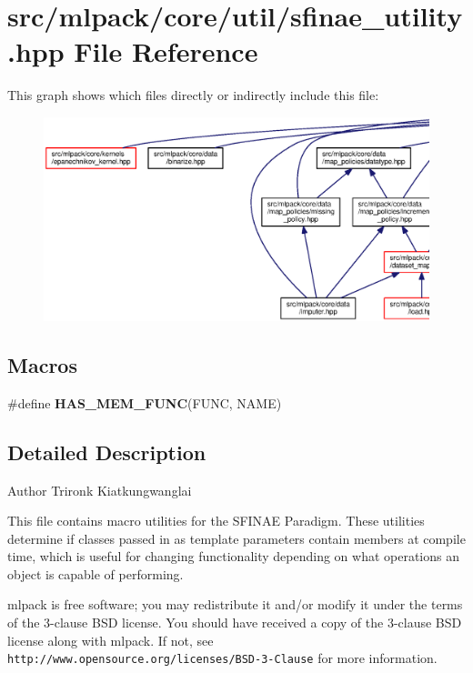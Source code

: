 \section{src/mlpack/core/util/sfinae\+\_\+utility.hpp File Reference}
\label{sfinae__utility_8hpp}
This graph shows which files directly or indirectly include this file\+:
\nopagebreak
\begin{figure}[H]
\begin{center}
\leavevmode
\includegraphics[width=350pt]{sfinae__utility_8hpp__dep__incl}
\end{center}
\end{figure}
\subsection*{Macros}
\begin{DoxyCompactItemize}
\item 
\#define {\bf H\+A\+S\+\_\+\+M\+E\+M\+\_\+\+F\+U\+NC}(F\+U\+NC,  N\+A\+ME)
\end{DoxyCompactItemize}


\subsection{Detailed Description}
\begin{DoxyAuthor}{Author}
Trironk Kiatkungwanglai
\end{DoxyAuthor}
This file contains macro utilities for the S\+F\+I\+N\+AE Paradigm. These utilities determine if classes passed in as template parameters contain members at compile time, which is useful for changing functionality depending on what operations an object is capable of performing.

mlpack is free software; you may redistribute it and/or modify it under the terms of the 3-\/clause B\+SD license. You should have received a copy of the 3-\/clause B\+SD license along with mlpack. If not, see {\tt http\+://www.\+opensource.\+org/licenses/\+B\+S\+D-\/3-\/\+Clause} for more information. 

